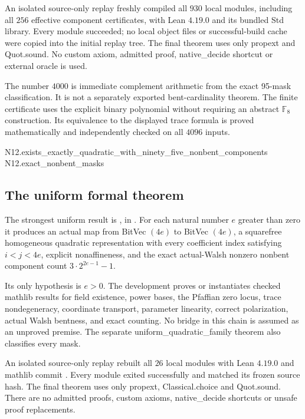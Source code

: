 \documentclass[11pt,a4paper]{article}
\newcommand{\F}{\mathbb F}
\theoremstyle{definition}
\begin{document}
An isolated source-only replay freshly compiled all $930$ local modules, including all $256$ effective component certificates, with Lean $4.19.0$ and its bundled Std library. Every module succeeded; no local object files or successful-build cache were copied into the initial replay tree. The final theorem uses only propext and Quot.sound. No custom axiom, admitted proof, native\_decide shortcut or external oracle is used.


The number $4000$ is immediate complement arithmetic from the exact 95-mask classification. It is not a separately exported bent-cardinality theorem. The finite certificate uses the explicit binary polynomial without requiring an abstract $\F_{8}$ construction. Its equivalence to the displayed trace formula is proved mathematically and independently checked on all $4096$ inputs.


\begin{Code}
N12.exists_exactly_quadratic_with_ninety_five_nonbent_components
N12.exact_nonbent_masks
\end{Code}

\subsection{The uniform formal theorem}

The strongest uniform result is , in . For each natural number $e$ greater than zero it produces an actual map from BitVec $(4e)$ to BitVec $(4e)$, a squarefree homogeneous quadratic representation with every coefficient index satisfying $i < j < 4e$, explicit nonaffineness, and the exact actual-Walsh nonzero nonbent component count $3\cdot 2^{2e-1}-1$.


Its only hypothesis is $e > 0$. The development proves or instantiates checked mathlib results for field existence, power bases, the Pfaffian zero locus, trace nondegeneracy, coordinate transport, parameter linearity, correct polarization, actual Walsh bentness, and exact counting. No bridge in this chain is assumed as an unproved premise. The separate uniform\_quadratic\_family theorem also classifies every mask.


An isolated source-only replay rebuilt all $26$ local modules with Lean $4.19.0$ and mathlib commit . Every module exited successfully and matched its frozen source hash. The final theorem uses only propext, Classical.choice and Quot.sound. There are no admitted proofs, custom axioms, native\_decide shortcuts or unsafe proof replacements.
\end{document}
